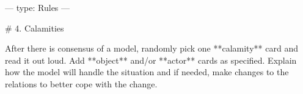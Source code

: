 ---
type: Rules
---

# 4. Calamities

After there is consensus of a model, randomly pick one **calamity** card and read it out loud.
Add **object** and/or **actor** cards as specified. Explain how the model will handle the situation and if needed, make changes to the relations to better cope with the change.
